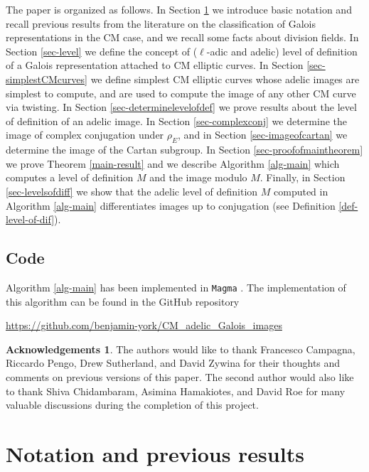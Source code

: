 \documentclass[11pt]{amsart}
\theoremstyle{definition}
\newtheorem*{ack}{Acknowledgements}
\begin{document}
The paper is organized as follows. In Section \ref{sec-notation} we introduce basic notation and recall previous results from the literature on the classification of Galois representations in the CM case, and we recall some facts about division fields. In Section \ref{sec-level} we define the concept of ($\ell$-adic and adelic) level of definition of a Galois representation attached to CM elliptic curves. In Section \ref{sec-simplestCMcurves} we define  simplest CM elliptic curves whose adelic images are simplest to compute, and are used to compute the image of any other CM curve via twisting. In Section \ref{sec-determinelevelofdef} we prove results about the level of definition of an adelic image. In Section  \ref{sec-complexconj} we determine the image of complex conjugation under $\rho_E$, and in Section  \ref{sec-imageofcartan} we determine the image of the Cartan subgroup. In Section \ref{sec-proofofmaintheorem} we prove Theorem \ref{main-result} and we describe Algorithm \ref{alg-main} which computes a level of definition $M$ and the image modulo $M$. Finally, in Section \ref{sec-levelsofdiff} we show that the adelic level of definition $M$ computed in Algorithm \ref{alg-main} differentiates images up to conjugation (see Definition \ref{def-level-of-dif}).

\subsection{Code}

Algorithm \ref{alg-main} has been implemented in \verb|Magma| \cite{magma}. The implementation of this algorithm can be found in the GitHub repository \cite{githubrepo}
\begin{center}
    \url{https://github.com/benjamin-york/CM_adelic_Galois_images}
\end{center}


\begin{ack}
    The authors would like to thank Francesco Campagna, Riccardo Pengo, Drew Sutherland, and David Zywina for their thoughts and comments on previous versions of this paper. The second author would also like to thank Shiva Chidambaram, Asimina Hamakiotes, and David Roe for many valuable discussions during the completion of this project.
\end{ack}

\section{Notation and previous results}\label{sec-notation}
\end{document}
